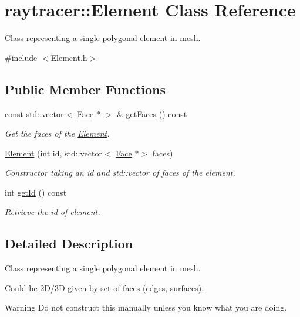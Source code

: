 \hypertarget{classraytracer_1_1Element}{}\section{raytracer\+:\+:Element Class Reference}
\label{classraytracer_1_1Element}


Class representing a single polygonal element in mesh.  




{\ttfamily \#include $<$Element.\+h$>$}

\subsection*{Public Member Functions}
\begin{DoxyCompactItemize}
\item 
const std\+::vector$<$ \hyperlink{classraytracer_1_1Face}{Face} $\ast$ $>$ \& \hyperlink{classraytracer_1_1Element_a46d4135d6ef7fd7c34656aa90f35b2ed}{get\+Faces} () const
\begin{DoxyCompactList}\small\item\em Get the faces of the \hyperlink{classraytracer_1_1Element}{Element}. \end{DoxyCompactList}\item 
\hyperlink{classraytracer_1_1Element_a70169ab8330ac32971e0925ae4ad2fd9}{Element} (int id, std\+::vector$<$ \hyperlink{classraytracer_1_1Face}{Face} $\ast$$>$ faces)
\begin{DoxyCompactList}\small\item\em Constructor taking an id and std\+::vector of faces of the element. \end{DoxyCompactList}\item 
int \hyperlink{classraytracer_1_1Element_ab56fe71038371416a91db232b27c006a}{get\+Id} () const
\begin{DoxyCompactList}\small\item\em Retrieve the id of element. \end{DoxyCompactList}\end{DoxyCompactItemize}


\subsection{Detailed Description}
Class representing a single polygonal element in mesh. 

Could be 2\+D/3D given by set of faces (edges, surfaces). \begin{DoxyWarning}{Warning}
Do not construct this manually unless you know what you are doing. 
\end{DoxyWarning}



